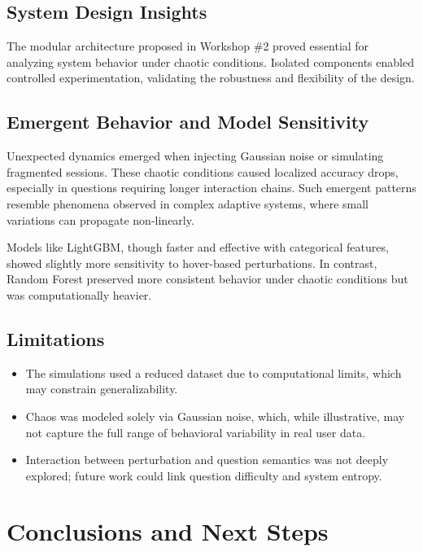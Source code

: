 \documentclass[12pt]{article}
\begin{document}
	\subsection{System Design Insights}
	
	The modular architecture proposed in Workshop \#2 proved essential for analyzing system behavior under chaotic conditions. Isolated components enabled controlled experimentation, validating the robustness and flexibility of the design.
	
	\subsection{Emergent Behavior and Model Sensitivity}
	
	Unexpected dynamics emerged when injecting Gaussian noise or simulating fragmented sessions. These chaotic conditions caused localized accuracy drops, especially in questions requiring longer interaction chains. Such emergent patterns resemble phenomena observed in complex adaptive systems, where small variations can propagate non-linearly.
	
	Models like LightGBM, though faster and effective with categorical features, showed slightly more sensitivity to hover-based perturbations. In contrast, Random Forest preserved more consistent behavior under chaotic conditions but was computationally heavier.
	
	\subsection{Limitations}
	
	\begin{itemize}
		\item The simulations used a reduced dataset due to computational limits, which may constrain generalizability.
		\item Chaos was modeled solely via Gaussian noise, which, while illustrative, may not capture the full range of behavioral variability in real user data.
		\item Interaction between perturbation and question semantics was not deeply explored; future work could link question difficulty and system entropy.
	\end{itemize}
	
	\section{Conclusions and Next Steps}
	
\end{document}

